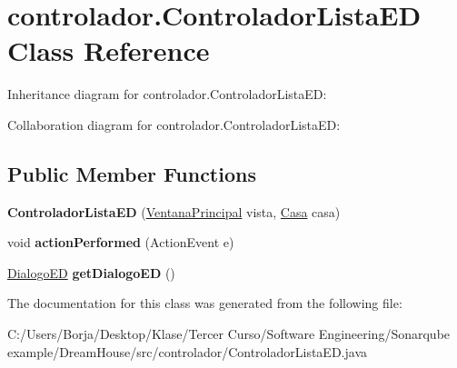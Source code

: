 \hypertarget{classcontrolador_1_1_controlador_lista_e_d}{}\section{controlador.\+Controlador\+Lista\+ED Class Reference}
\label{classcontrolador_1_1_controlador_lista_e_d}


Inheritance diagram for controlador.\+Controlador\+Lista\+ED\+:


Collaboration diagram for controlador.\+Controlador\+Lista\+ED\+:
\subsection*{Public Member Functions}
\begin{DoxyCompactItemize}
\item 
\mbox{\label{classcontrolador_1_1_controlador_lista_e_d_a104b9506109ea05b3d00ffc16041c97d}} 
{\bfseries Controlador\+Lista\+ED} (\mbox{\hyperlink{classvista_1_1_ventana_principal}{Ventana\+Principal}} vista, \mbox{\hyperlink{classmodelo_1_1_casa}{Casa}} casa)
\item 
\mbox{\label{classcontrolador_1_1_controlador_lista_e_d_a314311c80165a8dbc22415253dbecf16}} 
void {\bfseries action\+Performed} (Action\+Event e)
\item 
\mbox{\label{classcontrolador_1_1_controlador_lista_e_d_a3632ab1b0937e0e120ffddbbb453c02d}} 
\mbox{\hyperlink{classvista_1_1_dialogo_e_d}{Dialogo\+ED}} {\bfseries get\+Dialogo\+ED} ()
\end{DoxyCompactItemize}


The documentation for this class was generated from the following file\+:\begin{DoxyCompactItemize}
\item 
C\+:/\+Users/\+Borja/\+Desktop/\+Klase/\+Tercer Curso/\+Software Engineering/\+Sonarqube example/\+Dream\+House/src/controlador/Controlador\+Lista\+E\+D.\+java\end{DoxyCompactItemize}
